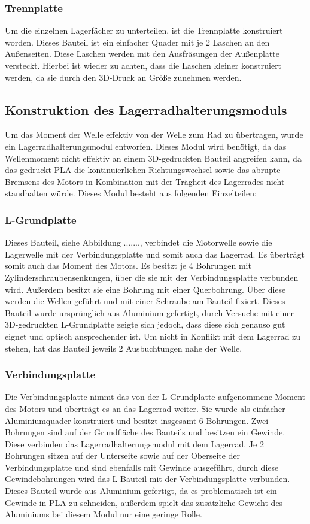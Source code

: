 \subsubsection{Trennplatte}
Um die einzelnen Lagerfächer zu unterteilen, ist die Trennplatte konstruiert worden. Dieses Bauteil ist ein einfacher
Quader mit je 2 Laschen an den Außenseiten. Diese Laschen werden mit den Ausfräsungen der Außenplatte versteckt.
Hierbei ist wieder zu achten, dass die Laschen kleiner konstruiert werden, da sie durch den 3D-Druck an Größe zunehmen
werden.

\subsection{Konstruktion des Lagerradhalterungsmoduls}
Um das Moment der Welle effektiv von der Welle zum Rad zu übertragen, wurde ein Lagerradhalterungsmodul entworfen. Dieses Modul wird
benötigt, da das Wellenmoment nicht effektiv an einem 3D-gedruckten Bauteil angreifen kann, da das gedruckt PLA
die kontinuierlichen Richtungswechsel sowie das abrupte Bremsens des Motors in Kombination mit der
Trägheit des Lagerrades nicht standhalten würde. Dieses Modul besteht aus folgenden Einzelteilen:

\subsubsection{L-Grundplatte}
Dieses Bauteil, siehe Abbildung ......., verbindet die Motorwelle sowie die Lagerwelle mit der Verbindungsplatte und somit auch das Lagerrad.
Es überträgt somit auch das Moment des Motors. Es besitzt je 4 Bohrungen mit Zylinderschraubensenkungen, über die sie mit
der Verbindungsplatte verbunden wird. Außerdem besitzt sie eine Bohrung mit einer Querbohrung. Über diese werden die
Wellen geführt und mit einer Schraube am Bauteil fixiert.
Dieses Bauteil wurde ursprünglich aus Aluminium gefertigt, durch Versuche mit einer 3D-gedruckten L-Grundplatte zeigte
sich jedoch, dass diese sich genauso gut eignet und optisch ansprechender ist. Um nicht in Konflikt mit dem Lagerrad
zu stehen, hat das Bauteil jeweils 2 Ausbuchtungen nahe der Welle.

\subsubsection{Verbindungsplatte}
Die Verbindungsplatte nimmt das von der L-Grundplatte aufgenommene Moment des Motors und überträgt es an das Lagerrad weiter.
Sie wurde als einfacher Aluminiumquader konstruiert und besitzt insgesamt 6 Bohrungen. Zwei Bohrungen sind auf der
Grundfläche des Bauteils und besitzen ein Gewinde. Diese verbinden das Lagerradhalterungsmodul mit dem Lagerrad. Je 2
Bohrungen sitzen auf der Unterseite sowie auf der Oberseite der Verbindungsplatte und sind ebenfalls mit Gewinde
ausgeführt, durch diese Gewindebohrungen wird das L-Bauteil mit der Verbindungsplatte verbunden.
Dieses Bauteil wurde aus Aluminium gefertigt, da es problematisch ist ein Gewinde in PLA zu schneiden, außerdem spielt
das zusätzliche Gewicht des Aluminiums bei diesem Modul nur eine geringe Rolle.

